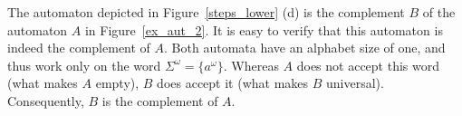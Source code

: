 The automaton depicted in Figure~\ref{steps_lower} (d) is the complement $B$ of the automaton $A$ in Figure~\ref{ex_aut_2}. It is easy to verify that this automaton is indeed the complement of $A$. Both automata have an alphabet size of one, and thus work only on the word $\Sigma^\omega = \{a^\omega\}$. Whereas $A$ does not accept this word (what makes $A$ empty), $B$ does accept it (what makes $B$ universal). Consequently, $B$ is the complement of $A$.







